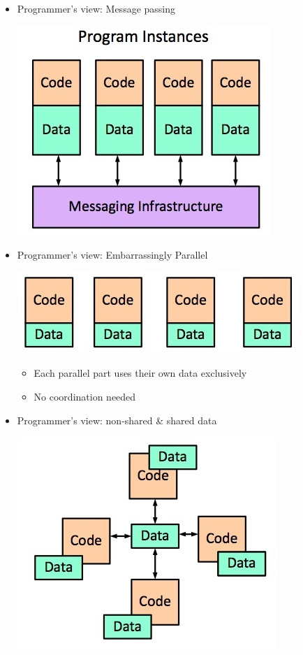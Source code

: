 \documentclass[a4paper]{article}
\begin{document}
\begin{itemize}
\item Programmer's view: Message passing
\begin{center}
\includegraphics[scale=0.4]{Figures/programmersViewMessagePassing.jpg}
\end{center}

\item Programmer's view: Embarrassingly Parallel
\begin{center}
\includegraphics[scale=0.4]{Figures/programmersViewEmbarrassinglyParallel.jpg}
\begin{itemize}
\item Each parallel part uses their own data exclusively
\item No coordination needed
\end{itemize}
\end{center}

\item Programmer's view: non-shared \& shared data
\begin{center}
\includegraphics[scale=0.4]{Figures/programmersViewNonSharedAndSharedData.jpg}
\end{center}



\end{itemize}
\end{document}
